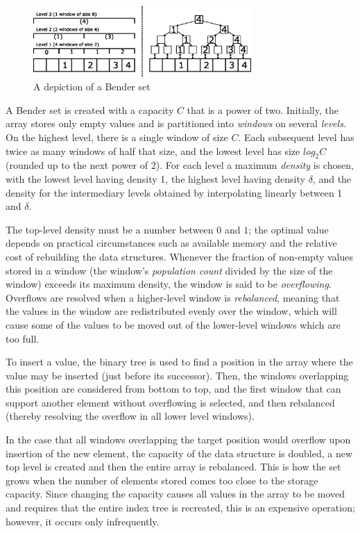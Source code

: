 \documentclass{acm_proc_article-sp}
\begin{document}
\begin{figure}
\centering
\includegraphics[width=83mm]{bender-set}
\caption{A depiction of a Bender set}
\label{fig-bender-set}
\end{figure}

A Bender set is created with a capacity $C$ that is a power of two.
Initially, the array stores only empty values and is partitioned into
\emph{windows} on several \emph{levels}.
On the highest level, there is a single window of size $C$. Each subsequent level
has twice as many windows of half that size, and the lowest level has size
$log_2 C$ (rounded up to the next power of 2).
For each level a maximum \emph{density} is chosen, with the lowest level having
density 1, the highest level having density $\delta$, and the density for
the intermediary levels obtained by interpolating linearly between 1 and
$\delta$.

The top-level density must be a number between $0$ and $1$; the optimal value
depends on practical circumstances such as available memory and the relative
cost of rebuilding the data structures.
Whenever the fraction of non-empty values stored in a window (the window's
\emph{population count} divided by the size of the window) exceeds its maximum
density, the window is said to be \emph{overflowing}.
Overflows are resolved when a higher-level window is \emph{rebalanced},
meaning that the values in the window are redistributed evenly over the window,
which will cause some of the values to be moved out of the lower-level windows
which are too full.

To insert a value, the binary tree is used to find a position in the array
where the value may be inserted (just before its successor). Then, the windows
overlapping this position are considered from bottom to top, and the first
window that can support another element without overflowing is selected, and
then rebalanced (thereby resolving the overflow in all lower level windows).

In the case that all windows overlapping the target position would overflow upon
insertion of the new element, the capacity of the data structure is doubled,
a new top level is created and then the entire array is rebalanced. This is how
the set grows when the number of elements stored comes too close to the storage
capacity. Since changing the capacity causes all values in the array to be moved
and requires that the entire index tree is recreated, this is an expensive
operation; however, it occurs only infrequently.
\end{document}
